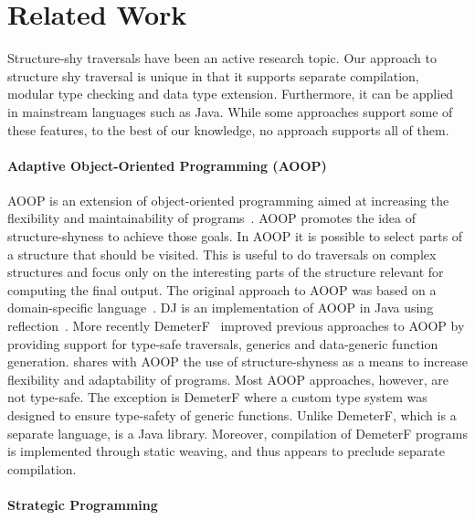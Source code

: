\section{Related Work}\label{sec:related}


Structure-shy traversals have been an active research topic.  Our
approach to structure shy traversal is unique in that it supports
separate compilation, modular type checking and data type
extension. Furthermore, it can be applied in mainstream languages such
as Java. While some approaches support some of these features, to the
best of our knowledge, no approach supports all of them.

\paragraph{Adaptive Object-Oriented Programming (AOOP)}
AOOP is an extension of object-oriented programming
aimed at increasing the flexibility and maintainability of
programs~\cite{DemeterBook}. AOOP promotes the idea of structure-shyness to achieve those
goals. In AOOP it is possible to select parts of a structure that
should be visited. This is useful to do traversals on complex
structures and focus only on the interesting parts of the structure
relevant for computing the final output. The original approach to AOOP
was based on a domain-specific language~\cite{DemeterBook}. DJ is an
implementation of AOOP in Java using reflection~\cite{DJ}. More
recently DemeterF~\cite{OOGP} improved previous approaches to AOOP by
providing support for type-safe traversals, generics and data-generic
function generation. \name shares with AOOP the use of
structure-shyness as a means to increase flexibility and adaptability
of programs.  Most AOOP approaches, however, are not type-safe. The
exception is DemeterF where a custom type system was designed to
ensure type-safety of generic functions. Unlike DemeterF, which is a
separate language, \name is a Java library.  Moreover, compilation of
DemeterF programs is implemented through static weaving, and thus appears to
preclude separate compilation.

\paragraph{Strategic Programming}

